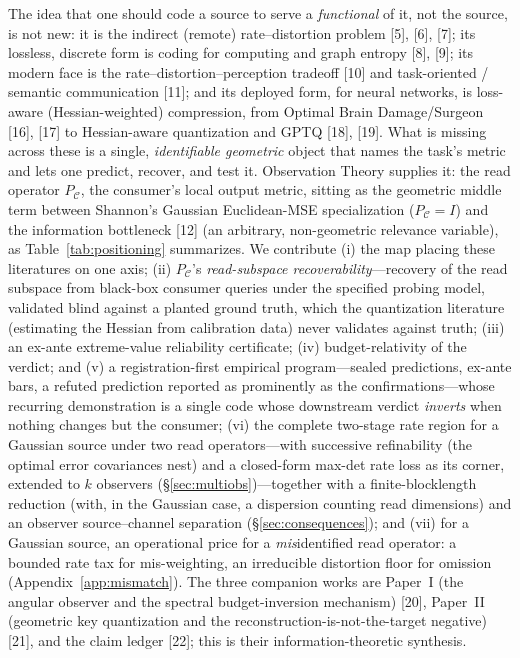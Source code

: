 \documentclass[lettersize,onecolumn]{IEEEtran}
\theoremstyle{definition}
\theoremstyle{remark}
\newcommand{\PC}{P_{\mathcal{C}}}
\begin{document}
The idea that one should code a source to serve a \emph{functional} of it, not the
source, is not new: it is the indirect (remote) rate--distortion problem
[5], [6], [7]; its lossless, discrete form is
coding for computing and graph entropy [8], [9]; its modern
face is the rate--distortion--perception tradeoff [10] and task-oriented
/ semantic communication [11]; and its deployed form, for neural
networks, is loss-aware (Hessian-weighted) compression, from Optimal Brain
Damage/Surgeon [16], [17] to Hessian-aware quantization and GPTQ
[18], [19]. What is missing across these is a single,
\emph{identifiable geometric} object that names the task's metric and lets one
predict, recover, and test it. Observation Theory supplies it: the read operator
$\PC$, the consumer's local output metric, sitting as the geometric middle term
between Shannon's Gaussian Euclidean-MSE specialization ($\PC=I$) and the information
bottleneck [12] (an arbitrary, non-geometric relevance variable), as
Table~\ref{tab:positioning} summarizes. We
contribute (i) the map placing these literatures on one axis; (ii) $\PC$'s
\emph{read-subspace recoverability}---recovery of the read subspace from black-box
consumer queries under the specified probing model, validated blind against a
planted ground truth, which the quantization literature (estimating the Hessian from
calibration data) never validates against truth; (iii) an ex-ante extreme-value
reliability certificate; (iv) budget-relativity of the verdict; and (v) a
registration-first empirical program---sealed predictions, ex-ante bars, a refuted
prediction reported as prominently as the confirmations---whose recurring
demonstration is a single code whose downstream verdict \emph{inverts} when nothing
changes but the consumer; (vi) the complete two-stage rate region for a Gaussian source
under two read operators---with successive refinability (the optimal error covariances
nest) and a
closed-form max-det rate loss as its corner, extended to $k$ observers
(\S\ref{sec:multiobs})---together with a finite-blocklength reduction (with, in the
Gaussian case, a dispersion counting read dimensions) and an observer source--channel
separation (\S\ref{sec:consequences}); and (vii) for a Gaussian source, an operational
price for a \emph{mis}identified read operator: a bounded rate tax for mis-weighting, an
irreducible distortion floor for omission (Appendix~\ref{app:mismatch}).
The three companion works are Paper~I (the angular observer and the spectral
budget-inversion mechanism) [20], Paper~II (geometric key quantization and
the reconstruction-is-not-the-target negative) [21], and the claim ledger
[22]; this is their information-theoretic synthesis.
\end{document}
